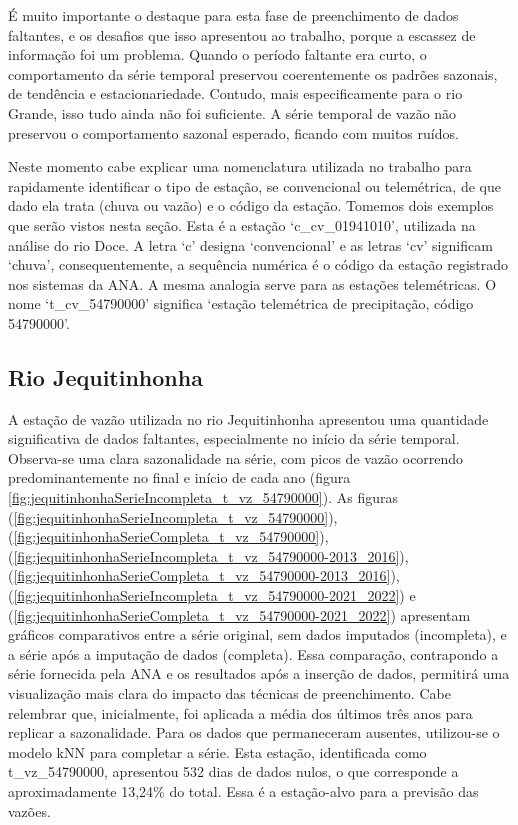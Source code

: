 É muito importante o destaque para esta fase de preenchimento de dados faltantes, e os desafios que isso apresentou ao trabalho, porque a escassez de informação foi um problema. Quando o período faltante era curto, o comportamento da série temporal preservou coerentemente os padrões sazonais, de tendência e estacionariedade. Contudo, mais especificamente para o rio Grande, isso tudo ainda não foi suficiente. A série temporal de vazão não preservou o comportamento sazonal esperado, ficando com muitos ruídos.

Neste momento cabe explicar uma nomenclatura utilizada no trabalho para rapidamente identificar o tipo de estação, se convencional ou telemétrica, de que dado ela trata (chuva ou vazão) e o código da estação. Tomemos dois exemplos que serão vistos nesta seção. Esta é a estação `c\_cv\_01941010', utilizada na análise do rio Doce. A letra `c' designa `convencional' e as letras `cv' significam `chuva', consequentemente, a sequência numérica é o código da estação registrado nos sistemas da ANA. A mesma analogia serve para as estações telemétricas. O nome `t\_cv\_54790000' significa `estação telemétrica de precipitação, código 54790000'.

\subsection{Rio Jequitinhonha}

A estação de vazão utilizada no rio Jequitinhonha apresentou uma quantidade significativa de dados faltantes, especialmente no início da série temporal. Observa-se uma clara sazonalidade na série, com picos de vazão ocorrendo predominantemente no final e início de cada ano (figura \ref{fig:jequitinhonhaSerieIncompleta_t_vz_54790000}).
As figuras (\ref{fig:jequitinhonhaSerieIncompleta_t_vz_54790000}), (\ref{fig:jequitinhonhaSerieCompleta_t_vz_54790000}), (\ref{fig:jequitinhonhaSerieIncompleta_t_vz_54790000-2013_2016}), (\ref{fig:jequitinhonhaSerieCompleta_t_vz_54790000-2013_2016}), (\ref{fig:jequitinhonhaSerieIncompleta_t_vz_54790000-2021_2022}) e (\ref{fig:jequitinhonhaSerieCompleta_t_vz_54790000-2021_2022}) apresentam gráficos comparativos entre a série original, sem dados imputados (incompleta), e a série após a imputação de dados (completa). Essa comparação, contrapondo a série fornecida pela ANA e os resultados após a inserção de dados, permitirá uma visualização mais clara do impacto das técnicas de preenchimento. Cabe relembrar que, inicialmente, foi aplicada a média dos últimos três anos para replicar a sazonalidade. Para os dados que permaneceram ausentes, utilizou-se o modelo kNN para completar a série. Esta estação, identificada como t\_vz\_54790000, apresentou 532 dias de dados nulos, o que corresponde a aproximadamente 13,24\% do total. Essa é a estação-alvo para a previsão das vazões.

